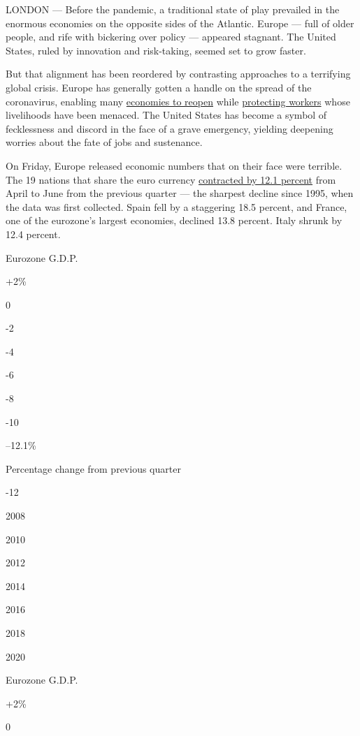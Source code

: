 LONDON --- Before the pandemic, a traditional state of play prevailed in
the enormous economies on the opposite sides of the Atlantic. Europe ---
full of older people, and rife with bickering over policy --- appeared
stagnant. The United States, ruled by innovation and risk-taking, seemed
set to grow faster.

But that alignment has been reordered by contrasting approaches to a
terrifying global crisis. Europe has generally gotten a handle on the
spread of the coronavirus, enabling many
\href{https://www.nytimes3xbfgragh.onion/2020/07/14/business/europe-consumer-spending.html}{economies
to reopen} while
\href{https://www.nytimes3xbfgragh.onion/2020/07/03/business/economy/europe-us-jobless-coronavirus.html}{protecting
workers} whose livelihoods have been menaced. The United States has
become a symbol of fecklessness and discord in the face of a grave
emergency, yielding deepening worries about the fate of jobs and
sustenance.

On Friday, Europe released economic numbers that on their face were
terrible. The 19 nations that share the euro currency
\href{https://www.nytimes3xbfgragh.onion/live/2020/07/31/business/stock-market-today-coronavirus?action=click\&module=Top\%20Stories\&pgtype=Homepage}{contracted
by 12.1 percent} from April to June from the previous quarter --- the
sharpest decline since 1995, when the data was first collected. Spain
fell by a staggering 18.5 percent, and France, one of the eurozone's
largest economies, declined 13.8 percent. Italy shrunk by 12.4 percent.

Eurozone G.D.P.

+2\%

0

-2

-4

-6

-8

-10

--12.1\%

Percentage change from previous quarter

-12

2008

2010

2012

2014

2016

2018

2020

Eurozone G.D.P.

+2\%

0

